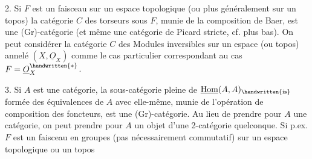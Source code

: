  2. Si $F$ est un faisceau  sur un espace topologique (ou plus généralement sur un topos)\handwritten{,} la catégorie $C$ des torseurs sous $F$, munie de la composition de Baer, est une (Gr)-catégorie (et même une catégorie de Picard stricte, cf. plus bas). On peut considérer la catégorie $C$ des Modules inversibles sur un espace (ou topos)  annelé  $(X,\underline O_X)$ comme le cas particulier correspondant au cas $F=\underline O_X^{\handwritten{*}}$.

 3. Si $A$ est une catégorie, la sous-catégorie pleine  de $\underline{\operatorname{Hom}}(A,A)_{\handwritten{\mathrm{is}}}$ formée des équivalences de $A$ avec elle-même, munie de l'opération de composition des foncteurs, est une (Gr)-catégorie. Au lieu de prendre pour $A$ une catégorie, on peut  prendre pour $A$ un objet d'une 2-catégorie quelconque. Si p.ex. $F$ est un faisceau en groupes (pas nécessairement commutatif) sur un espace topologique \handwritten{(}ou un topos
